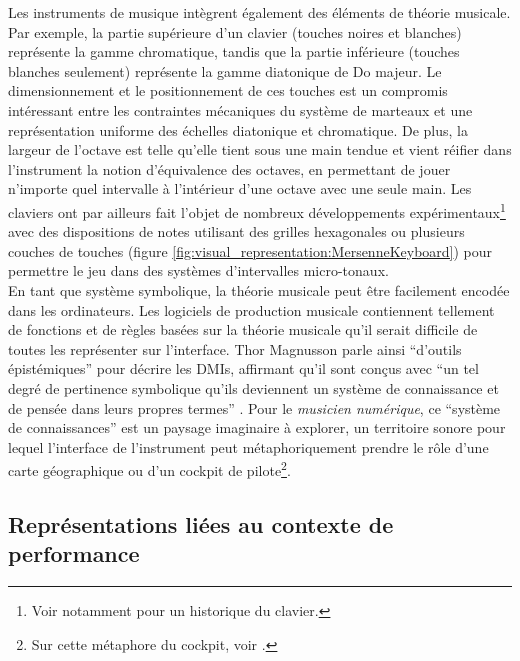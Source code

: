 \noindent Les instruments de musique intègrent également des éléments de théorie musicale. Par exemple, la partie supérieure d'un clavier (touches noires et blanches) représente la gamme chromatique, tandis que la partie inférieure (touches blanches seulement) représente la gamme diatonique de Do majeur. Le dimensionnement et le positionnement de ces touches est un compromis intéressant entre les contraintes mécaniques du système de marteaux et une représentation uniforme des échelles diatonique et chromatique. De plus, la largeur de l'octave est telle qu'elle tient sous une main tendue et vient réifier dans l'instrument la notion d'équivalence des octaves, en permettant de jouer n'importe quel intervalle à l'intérieur d'une octave avec une seule main. Les claviers ont par ailleurs fait l'objet de nombreux développements expérimentaux\footnote{Voir notamment \cite{haury_petite_1999} pour un historique du clavier.} avec des dispositions de notes utilisant des grilles hexagonales ou plusieurs couches de touches (figure \ref{fig:visual_representation:MersenneKeyboard}) pour permettre le jeu dans des systèmes d'intervalles micro-tonaux.\\
\indent En tant que système symbolique, la théorie musicale peut être facilement encodée dans les ordinateurs. Les logiciels de production musicale contiennent tellement de fonctions et de règles basées sur la théorie musicale qu'il serait difficile de toutes les représenter sur l'interface. Thor Magnusson parle ainsi ``d'outils épistémiques'' pour décrire les \glspl{DMI}, affirmant qu'il sont conçus avec ``un tel degré de pertinence symbolique qu'ils deviennent un système de connaissance et de pensée dans leurs propres termes'' \cite{magnusson_epistemic_2009}. Pour le \textit{musicien numérique}, ce ``système de connaissances'' est un paysage imaginaire à explorer, un territoire sonore pour lequel l'interface de l'instrument peut métaphoriquement prendre le rôle d'une carte géographique ou d'un cockpit de pilote\footnote{Sur cette métaphore du cockpit, voir \cite{vertegaal_towards_1996}.}.

\subsection{Représentations liées au contexte de performance}

